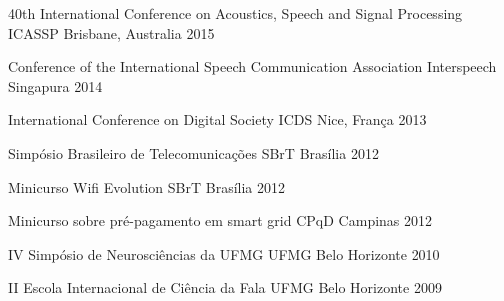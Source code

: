 

\begin{cvhonors}

  \cvhonor
    {40th International Conference on Acoustics, Speech and Signal Processing} %
    {ICASSP} %
    {Brisbane, Australia} %
    {2015} %

  \cvhonor
    {Conference of the International Speech Communication Association} %
    {Interspeech} %
    {Singapura} %
    {2014} %

  \cvhonor
    {International Conference on Digital Society} %
    {ICDS} %
    {Nice, França} %
    {2013} %

  \cvhonor
    {Simpósio Brasileiro de Telecomunicações} %
    {SBrT} %
    {Brasília} %
    {2012} %

  \cvhonor
    {Minicurso Wifi Evolution} %
    {SBrT} %
    {Brasília} %
    {2012} %

  \cvhonor
    {Minicurso sobre pré-pagamento em smart grid} %
    {CPqD} %
    {Campinas} %
    {2012} %

  \cvhonor
    {IV Simpósio de Neurosciências da UFMG} %
    {UFMG} %
    {Belo Horizonte} %
    {2010} %

  \cvhonor
    {II Escola Internacional de Ciência da Fala} %
    {UFMG} %
    {Belo Horizonte} %
    {2009} %

\end{cvhonors}
